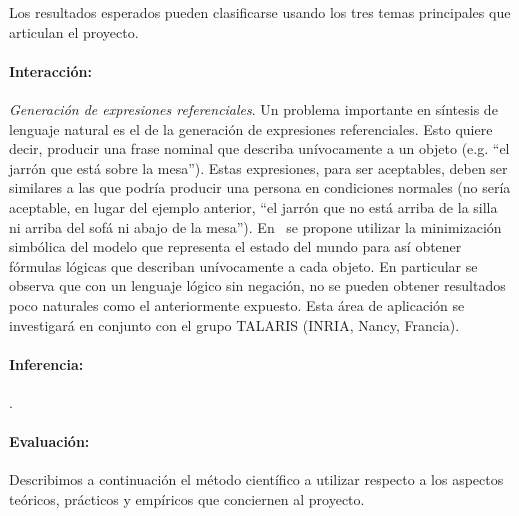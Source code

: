 
\vspace*{.2cm}%



Los resultados esperados pueden clasificarse usando los
tres temas principales que articulan el proyecto.


\paragraph{Interacci\'on:}

\emph{Generaci\'on de expresiones referenciales}. Un problema importante en
s\'intesis de lenguaje natural es el de la generaci\'on de expresiones referenciales. Esto quiere decir, producir una frase nominal que describa un\'ivocamente a un objeto (e.g. ``el jarr\'on que est\'a sobre la mesa''). Estas expresiones, para ser aceptables, deben ser similares a las que podr\'ia producir una persona en condiciones normales (no ser\'ia aceptable, en lugar del ejemplo anterior, ``el jarr\'on que no est\'a arriba de la silla ni arriba del sof\'a ni abajo de la mesa'').  En~\cite{AKS08} se propone utilizar la minimizaci\'on simb\'olica del modelo que representa
el estado del mundo para as\'i obtener f\'ormulas l\'ogicas que describan
un\'ivocamente a cada objeto. En particular se observa que con un
lenguaje l\'ogico sin negaci\'on, no se pueden obtener resultados poco
naturales como el anteriormente expuesto. Esta \'area de aplicaci\'on se
investigar\'a en conjunto con el grupo TALARIS (INRIA,
Nancy, Francia).

\paragraph{Inferencia:}
\citep{arec:logi00}.


\paragraph{Evaluaci\'on:}



Describimos a continuaci\'on el m\'etodo cient\'ifico a utilizar
respecto a los aspectos te\'oricos, pr\'acticos y emp\'iricos
que conciernen al proyecto.

